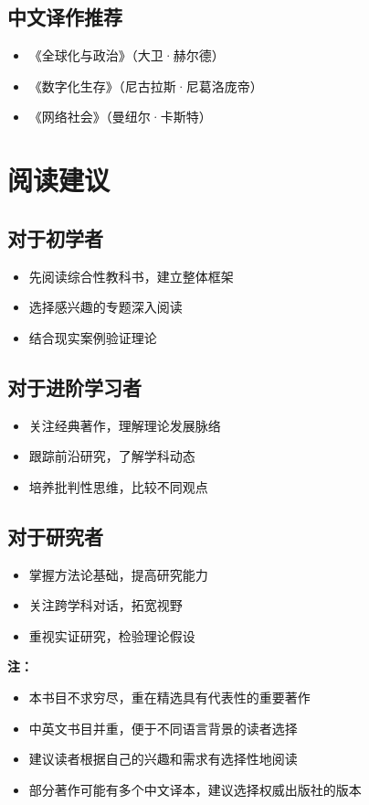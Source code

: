 \subsection{中文译作推荐}
\begin{itemize}
    \item 《全球化与政治》（大卫·赫尔德）
    \item 《数字化生存》（尼古拉斯·尼葛洛庞帝）
    \item 《网络社会》（曼纽尔·卡斯特）
\end{itemize}

\hrulefill

\section{阅读建议}

\subsection{对于初学者}
\begin{itemize}
    \item 先阅读综合性教科书，建立整体框架
    \item 选择感兴趣的专题深入阅读
    \item 结合现实案例验证理论
\end{itemize}

\subsection{对于进阶学习者}
\begin{itemize}
    \item 关注经典著作，理解理论发展脉络
    \item 跟踪前沿研究，了解学科动态
    \item 培养批判性思维，比较不同观点
\end{itemize}

\subsection{对于研究者}
\begin{itemize}
    \item 掌握方法论基础，提高研究能力
    \item 关注跨学科对话，拓宽视野
    \item 重视实证研究，检验理论假设
\end{itemize}

\hrulefill

\textbf{注：}
\begin{itemize}
    \item 本书目不求穷尽，重在精选具有代表性的重要著作
    \item 中英文书目并重，便于不同语言背景的读者选择
    \item 建议读者根据自己的兴趣和需求有选择性地阅读
    \item 部分著作可能有多个中文译本，建议选择权威出版社的版本
\end{itemize}